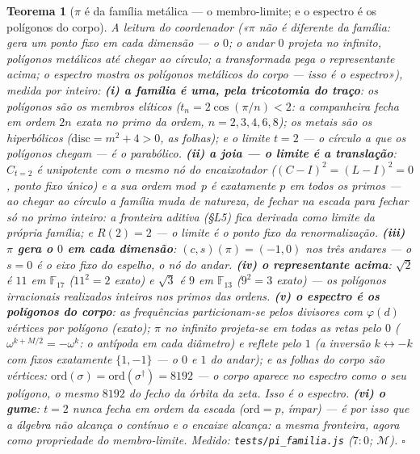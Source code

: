 \documentclass[11pt,a4paper]{article}
\newtheorem{teorema}{Teorema}
\newcommand{\code}[1]{\texttt{\small #1}}
\begin{document}
\begin{teorema}[$\pi$ é da família metálica --- o membro-limite; e o
espectro é os polígonos do corpo]\label{thm:pi-familia}
A leitura do coordenador («$\pi$ não é diferente da família: gera um
ponto fixo em cada dimensão --- o $0$; o andar $0$ projeta no
infinito, polígonos metálicos até chegar ao círculo; a transformada
pega o representante acima; o espectro mostra os polígonos metálicos
do corpo --- isso é o espectro»), medida por inteiro:
\textbf{(i) a família é uma, pela tricotomia do traço}: os polígonos
são os membros \emph{elíticos} ($t_{n}=2\cos(\pi/n)<2$: a companheira
fecha em ordem $2n$ exata no primo da ordem, $n=2,3,4,6,8$); os
metais são os \emph{hiperbólicos} ($\mathrm{disc}=m^{2}{+}4>0$, as
folhas); e o limite $t=2$ --- o círculo a que os polígonos chegam ---
é o \emph{parabólico}.
\textbf{(ii) a joia --- o limite é a translação}: $C_{t=2}$ é
unipotente com o \emph{mesmo nó} do encaixotador
($(C{-}I)^{2}=(L{-}I)^{2}=0$, ponto fixo único) e a sua ordem
mod~$p$ é exatamente $p$ em todos os primos --- ao chegar ao círculo
a família muda de natureza, de fechar na escada para fechar só no
primo inteiro: \emph{a fronteira aditiva (\S L5) fica derivada como
limite da própria família}; e $R(2)=2$ --- o limite é o ponto fixo da
renormalização.
\textbf{(iii) $\pi$ gera o $0$ em cada dimensão}:
$(c,s)(\pi)=(-1,0)$ nos três andares --- o $s=0$ é o eixo fixo do
espelho, o nó do andar.
\textbf{(iv) o representante acima}: $\sqrt2$ é $11$ em
$\mathbb{F}_{17}$ ($11^{2}=2$ exato) e $\sqrt3$ é $9$ em
$\mathbb{F}_{13}$ ($9^{2}=3$ exato) --- os polígonos irracionais
realizados inteiros nos primos das ordens.
\textbf{(v) o espectro é os polígonos do corpo}: as frequências
particionam-se pelos divisores com $\varphi(d)$ vértices por
polígono (exato); $\pi$ no infinito projeta-se em \emph{todas} as
retas pelo $0$ ($\omega^{k+M/2}=-\omega^{k}$: o antípoda em cada
diâmetro) e \emph{reflete pelo $1$} (a inversão $k\leftrightarrow-k$
com fixos exatamente $\{1,-1\}$ --- o $0$ e $1$ do andar); e as
folhas do corpo são \emph{vértices}:
$\mathrm{ord}(\sigma)=\mathrm{ord}(\sigma^{\dagger})=8192$ --- o
corpo aparece no espectro como o \emph{seu} polígono, o mesmo $8192$
do fecho da órbita da zeta. \emph{Isso é o espectro.}
\textbf{(vi) o gume}: $t=2$ nunca fecha em ordem da escada
($\mathrm{ord}=p$, ímpar) --- é por isso que a álgebra não alcança o
contínuo e o encaixe alcança: a mesma fronteira, agora como
propriedade do membro-limite.
\emph{Medido:} \code{tests/pi\_familia.js} ($7{:}0$; $\mathcal{M}$).
$\square$
\end{teorema}
\end{document}
